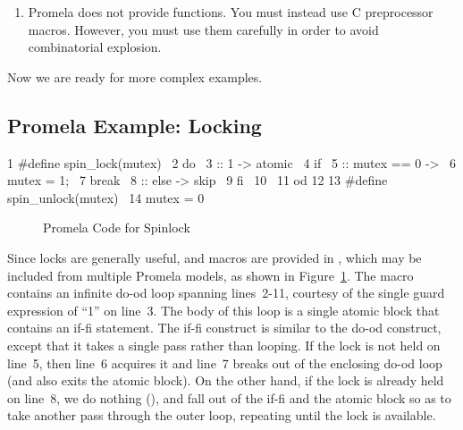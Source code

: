 \begin{enumerate}
	There is no reason to evaluate this assertion
	non-atomically, since it is not actually part of the algorithm.
	Because each statement contributes to state, we can reduce
	the number of useless states by enclosing it in an 
	block as shown in
	Figure~\ref{fig:analysis:Atomic Block for Complex Promela Assertion}

\item	Promela does not provide functions.
	You must instead use C preprocessor macros.
	However, you must use them carefully in order to avoid
	combinatorial explosion.
\end{enumerate}

Now we are ready for more complex examples.

\subsection{Promela Example: Locking}
\label{sec:formal:Promela Example: Locking}

{ \scriptsize
\begin{verbbox}
  1 #define spin_lock(mutex) \
  2   do \
  3   :: 1 -> atomic { \
  4       if \
  5       :: mutex == 0 -> \
  6         mutex = 1; \
  7         break \
  8       :: else -> skip \
  9       fi \
 10     } \
 11   od
 12
 13 #define spin_unlock(mutex) \
 14   mutex = 0
\end{verbbox}
}
\begin{figure}[tbp]
\centering
\theverbbox
\caption{Promela Code for Spinlock}
\label{fig:analysis:Promela Code for Spinlock}
\end{figure}

Since locks are generally useful,  and
macros are provided in , which may be included from
multiple Promela models, as shown in
Figure~\ref{fig:analysis:Promela Code for Spinlock}.
The  macro contains an infinite do-od loop
spanning lines~2-11,
courtesy of the single guard expression of ``1'' on line~3.
The body of this loop is a single atomic block that contains
an if-fi statement.
The if-fi construct is similar to the do-od construct, except
that it takes a single pass rather than looping.
If the lock is not held on line~5, then line~6 acquires it and
line~7 breaks out of the enclosing do-od loop (and also exits
the atomic block).
On the other hand, if the lock is already held on line~8,
we do nothing (\co{skip}), and fall out of the if-fi and the
atomic block so as to take another pass through the outer
loop, repeating until the lock is available.

